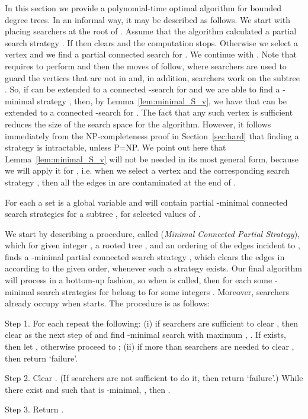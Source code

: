 \documentclass[10pt]{article}
\begin{document}
In this section we provide a polynomial-time optimal algorithm for bounded degree trees. In an informal way, it may be described as follows. We start with placing  searchers at the root  of . Assume that the algorithm calculated a partial search strategy . If  then  clears  and the computation stops. Otherwise we select a vertex  and we find a partial connected search  for . We continue with . Note that  requires  to perform  and then the moves of  follow, where  searchers are used to guard the vertices that are not in  and, in addition,  searchers work on the subtree . So, if  can be extended to a connected -search for  and we are able to find a -minimal strategy , then, by Lemma~\ref{lem:minimal_S_v}, we have that  can be extended to a connected -search for . The fact that any such vertex  is sufficient reduces the size of the search space for the algorithm. However, it follows immediately from the NP-completeness proof in Section~\ref{sec:hard} that finding a strategy  is intractable, unless P=NP. We point out here that Lemma~\ref{lem:minimal_S_v} will not be needed in its most general form, because we will apply it for , i.e. when we select a vertex  and the corresponding search strategy , then all the edges in  are contaminated at the end of .

For each  a set  is a global variable and will contain partial -minimal connected search strategies for a subtree , for selected values of .

We start by describing a procedure, called  (\emph{Minimal Connected Partial Strategy}), which for given integer , a rooted tree , and an ordering  of the edges incident to , finds a -minimal partial connected search strategy , which clears the edges in  according to the given order, whenever such a strategy exists. Our final algorithm will process  in a bottom-up fashion, so when  is called, then for each  some -minimal search strategies for  belong to  for some integers . Moreover,  searchers already occupy  when  starts. The procedure is as follows:
\begin{list}{}{}
\item[Step 1.] For each  repeat the following: (i) if  searchers are sufficient to clear , then clear  as the next step of  and find -minimal search  with maximum , . If  exists, then let , otherwise proceed to ; (ii) if more than  searchers are needed to clear , then return `failure'.
\item[Step 2.] Clear . (If  searchers are not sufficient to do it, then return `failure'.) While there exist  and  such that  is -minimal, , then .
\item[Step 3.] Return .
\end{list}
\end{document}
